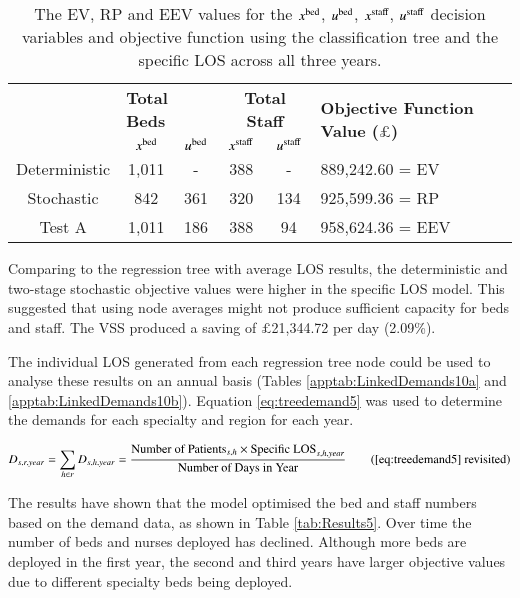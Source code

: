 \documentclass[../thesis.tex]{subfiles}
\begin{document}
\begin{table}[h!]
    \centering
    \begin{tabular}{cccccl}\toprule
 & \multicolumn{2}{l}{\textbf{Total Beds}} & \multicolumn{2}{c}{\textbf{Total Staff}} & \multirow{2}{*}{\textbf{Objective Function Value ($\pounds$)}}\\ \cmidrule(lr){2-3} \cmidrule(lr){4-5}
 & $x^\textnormal{bed}$           & $u^\textnormal{bed}$          & $x^\textnormal{staff}$         & $u^\textnormal{staff}$         \\ \midrule
    Deterministic      &  1,011 & - &388  & - & 889,242.60 = EV \\ \midrule
    Stochastic & 842 & 361 & 320 & 134 & 925,599.36 = RP \\ \midrule
    Test A & 1,011& 186 & 388 & 94 & 958,624.36 = EEV \\\bottomrule
    \end{tabular}
    \caption{The EV, RP and EEV values for the $x^\textnormal{bed}$, $u^\textnormal{bed}$, $x^\textnormal{staff}$, $u^\textnormal{staff}$ decision variables and objective function using the classification tree and the specific LOS across all three years.}
    \label{tab:Results9}
\end{table}

Comparing to the regression tree with average LOS results, the deterministic and two-stage stochastic objective values were higher in the specific LOS model. This suggested that using node averages might not produce sufficient capacity for beds and staff. The VSS produced a saving of $\pounds$21,344.72 per day (2.09\%). 

The individual LOS generated from each regression tree node could be used to analyse these results on an annual basis (Tables \ref{apptab:LinkedDemands10a} and \ref{apptab:LinkedDemands10b}). Equation \eqref{eq:treedemand5} was used to determine the demands for each specialty and region for each year.

\begin{equation}
        D_{s,r,year} = \sum\limits_{h \in r} D_{s,h,year} = \frac{\text{Number of Patients}_{s,h}\times{\text{Specific LOS}_{s,h,year}}}{{\text{Number of Days in Year}}} \tag{\ref{eq:treedemand5} revisited}
\end{equation}

The results have shown that the model optimised the bed and staff numbers based on the demand data, as shown in Table \ref{tab:Results5}. Over time the number of beds and nurses deployed has declined. Although more beds are deployed in the first year, the second and third years have larger objective values due to different specialty beds being deployed.
\end{document}
